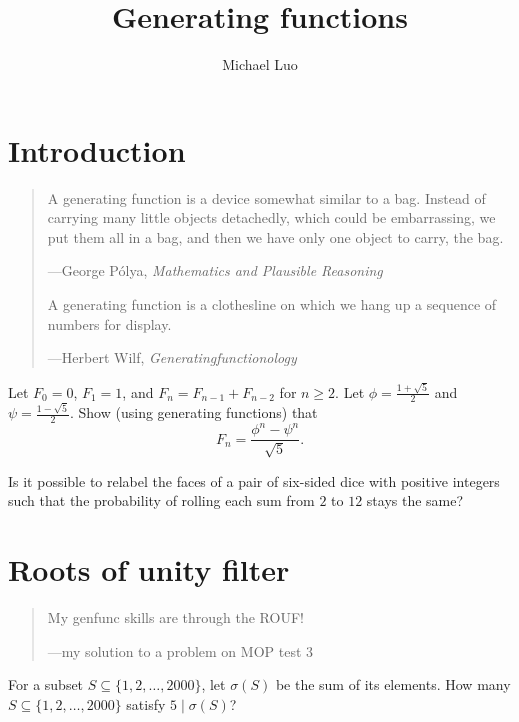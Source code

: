 \documentclass[11pt]{scrartcl}
\author{Michael Luo}
\title{Generating functions}
\begin{document}
\section{Introduction}

\begin{quote}
    \sffamily\small
    A generating function is a device somewhat similar to a bag. Instead of carrying many little objects detachedly, which could be embarrassing, we put them all in a bag, and then we have only one object to carry, the bag.

    \medskip
    
    ---George P\'olya, \emph{Mathematics and Plausible Reasoning}

    \bigskip

    A generating function is a clothesline on which we hang up a sequence of numbers for display.

    \medskip

    ---Herbert Wilf, \emph{Generatingfunctionology}
\end{quote}

\begin{example}
    Let $F_0 = 0$, $F_1 = 1$, and $F_n = F_{n - 1} + F_{n - 2}$ for $n \ge 2$. Let $\phi = \frac{1 + \sqrt5}2$ and $\psi = \frac{1 - \sqrt5}2$. Show (using generating functions) that
    \[F_n = \frac{\phi^n - \psi^n}{\sqrt5}.\]
\end{example}

\begin{example}
    Is it possible to relabel the faces of a pair of six-sided dice with positive integers such that the probability of rolling each sum from $2$ to $12$ stays the same?
\end{example}

\section{Roots of unity filter}

\begin{quote}
    \sffamily\small
    My genfunc skills are through the ROUF!

    \medskip

    ---my solution to a problem on MOP test 3
\end{quote}

\begin{example}
    For a subset $S \subseteq \{1,2,\dots,2000\}$, let $\sigma(S)$ be the sum of its elements. How many $S \subseteq \{1,2,\dots,2000\}$ satisfy $5 \mid \sigma(S)$?
\end{example}
\end{document}
